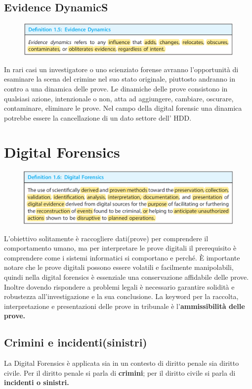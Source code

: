 \subsection{Evidence DynamicS}
\begin{figure}[h!]
    \includegraphics[width=\textwidth]{Capitolo 1/Figure/evidence-dynamic.png}
\end{figure}
In rari casi un investigatore o uno scienziato forense avranno l'opportunità di esaminare la scena del crimine nel suo stato originale, piuttosto andranno in contro a una dinamica delle prove.
Le dinamiche delle prove consistono in qualsiasi azione, intenzionale o non, atta ad aggiungere, cambiare, oscurare, contaminare, eliminare le prove.
Nel campo della digital forensic una dinamica potrebbe essere la cancellazione di un dato settore dell' HDD.

\clearpage
\section{Digital Forensics}
\begin{figure}[h!]
    \includegraphics[width=\textwidth]{Capitolo 1/Figure/digital-forensics-def.png}
\end{figure}
L'obiettivo solitamente è raccogliere dati(prove) per comprendere il comportamento umano, ma per interpretare le prove digitali il prerequisito è comprendere come i sistemi informatici si comportano e perché. 
È importante notare che le prove digitali possono essere volatili e facilmente manipolabili, quindi nella digital forensics è essenziale una conservazione affidabile delle prove.
Inoltre dovendo rispondere a problemi legali è necessario garantire solidità e robustezza all'investigazione e la sua conclusione.
La keyword per la raccolta, interpretazione e presentazioni delle prove in tribunale è l'\textbf{ammissibilità delle prove.}

\subsection{Crimini e incidenti(sinistri)}
La Digital Forensics è applicata sia in un contesto di diritto penale sia diritto civile. Per il diritto penale si parla di \textbf{crimini}; per il diritto civile si parla di \textbf{incidenti o sinistri.}
    





